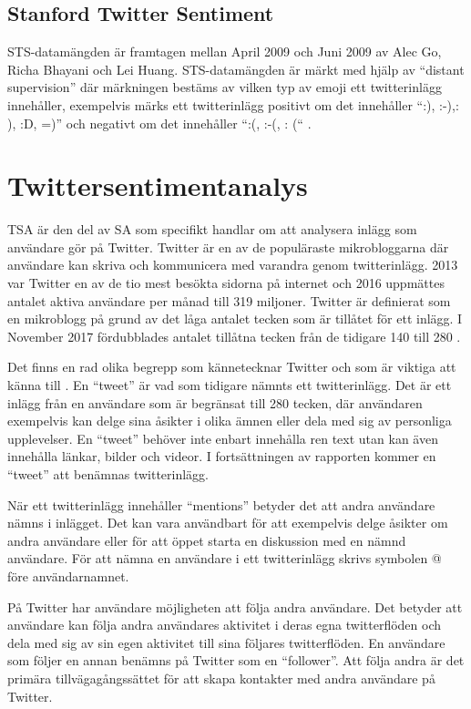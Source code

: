 \documentclass{kaumasters} %
\begin{document}
\subsection{Stanford Twitter Sentiment} \label{DSsts}
STS-datamängden är framtagen mellan April 2009 och Juni 2009 av Alec Go, Richa Bhayani och Lei Huang. STS-datamängden är märkt med hjälp av “distant supervision” där märkningen bestäms av vilken typ av emoji \cite{wiki:010} ett twitterinlägg innehåller, exempelvis märks ett twitterinlägg positivt om det innehåller “:), :-),: ), :D, =)” och negativt om det innehåller “:(, :-(, : (“ \cite{sts:001}. 

\section{Twittersentimentanalys} \label{TSA}
TSA är den del av SA som specifikt handlar om att analysera inlägg som användare gör på Twitter. Twitter är en av de populäraste mikrobloggarna där användare kan skriva och kommunicera med varandra genom twitterinlägg. 2013 var Twitter en av de tio mest besökta sidorna på internet och 2016 uppmättes antalet aktiva användare per månad till 319 miljoner. Twitter är definierat som en mikroblogg på grund av det låga antalet tecken som är tillåtet för ett inlägg. I November 2017 fördubblades antalet tillåtna tecken från de tidigare 140 till 280 \cite{wiki:008}. 

Det finns en rad olika begrepp som kännetecknar Twitter och som är viktiga att känna till \cite{TSAsurvey}. En “tweet” är vad som tidigare nämnts ett twitterinlägg. Det är ett inlägg från en användare som är begränsat till 280 tecken, där användaren exempelvis kan delge sina åsikter i olika ämnen eller dela med sig av personliga upplevelser. En “tweet” behöver inte enbart innehålla ren text utan kan även innehålla länkar, bilder och videor. I fortsättningen av rapporten kommer en “tweet” att benämnas twitterinlägg.

När ett twitterinlägg innehåller “mentions” betyder det att andra användare nämns i inlägget. Det kan vara användbart för att exempelvis delge åsikter om andra användare eller för att öppet starta en diskussion med en nämnd användare. För att nämna en användare i ett twitterinlägg skrivs symbolen @ före användarnamnet. 

På Twitter har användare möjligheten att följa andra användare. Det betyder att användare kan följa andra användares aktivitet i deras egna twitterflöden och dela med sig av sin egen aktivitet till sina följares twitterflöden. En användare som följer en annan benämns på Twitter som en “follower”. Att följa andra är det primära tillvägagångssättet för att skapa kontakter med andra användare på Twitter. 
\end{document}
